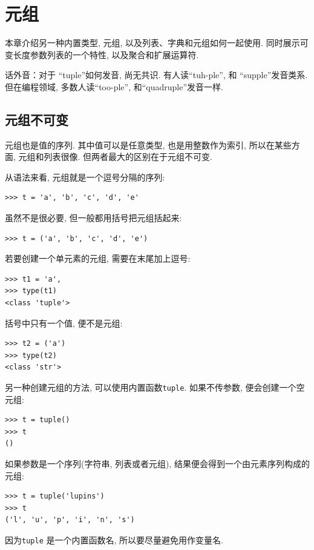 \documentclass[10pt]{book}
\begin{document}
\chapter{元组}
\label{tuplechap}

本章介绍另一种内置类型, 元组, 以及列表、字典和元组如何一起使用. 
同时展示可变长度参数列表的一个特性, 以及聚合和扩展运算符. 

话外音：对于 ``tuple''如何发音, 尚无共识. 有人读``tuh-ple'', 
和 ``supple''发音类系. 
但在编程领域, 多数人读``too-ple'', 和``quadruple''发音一样. 


\section{元组不可变}

元组也是值的序列. 其中值可以是任意类型, 也是用整数作为索引, 
所以在某些方面, 元组和列表很像. 
但两者最大的区别在于元组不可变. 

从语法来看, 元组就是一个逗号分隔的序列:

\begin{verbatim}
>>> t = 'a', 'b', 'c', 'd', 'e'
\end{verbatim}
%
虽然不是很必要, 但一般都用括号把元组括起来:

\begin{verbatim}
>>> t = ('a', 'b', 'c', 'd', 'e')
\end{verbatim}
%
若要创建一个单元素的元组, 需要在末尾加上逗号:

\begin{verbatim}
>>> t1 = 'a',
>>> type(t1)
<class 'tuple'>
\end{verbatim}
%
括号中只有一个值, 便不是元组:

\begin{verbatim}
>>> t2 = ('a')
>>> type(t2)
<class 'str'>
\end{verbatim}
%
另一种创建元组的方法, 可以使用内置函数{\tt tuple}. 
如果不传参数, 便会创建一个空元组:

\begin{verbatim}
>>> t = tuple()
>>> t
()
\end{verbatim}
%
如果参数是一个序列(字符串, 列表或者元组), 
结果便会得到一个由元素序列构成的元组:

\begin{verbatim}
>>> t = tuple('lupins')
>>> t
('l', 'u', 'p', 'i', 'n', 's')
\end{verbatim}
%
因为{\tt tuple} 是一个内置函数名, 
所以要尽量避免用作变量名. 
\end{document}
